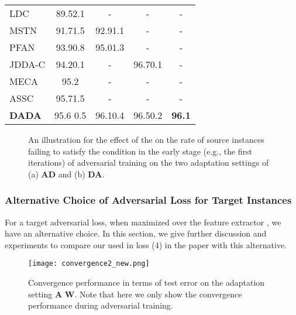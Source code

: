 \documentclass[letterpaper]{article} \usepackage{aaai20}  \usepackage{times}  \usepackage{helvet} \usepackage{courier}  \usepackage[hyphens]{url}  \usepackage{graphicx} \urlstyle{rm} \def\UrlFont{\rm}  \usepackage{graphicx}  \frenchspacing  \setlength{\pdfpagewidth}{8.5in}  \setlength{\pdfpageheight}{11in}
\begin{document}
\begin{table*}
\begin{center}
\begin{tabular}{lcccc}
			LDC \cite{layerWiseCorrection} & 89.52.1 & - & - & - \\ 

			MSTN \cite{mstn}        & 91.71.5 & 92.91.1 & - & - \\ 

			PFAN \cite{pfan}        & 93.90.8 & 95.01.3 & - & - \\ 

			JDDA-C \cite{jdda}      & 94.20.1 & - & 96.70.1 & - \\

			MECA \cite{meca}        & 95.2 & - & - & - \\
			
			ASSC \cite{associativeDA}        & 95.71.5 & - & - & - \\ 

			\hline
			\textbf{DADA}           & 95.6  0.5 & 96.10.4 & 96.50.2 & \textbf{96.1} \\
			\hline
		\end{tabular} 
	\end{center}
\end{table*} 


\begin{figure}[t]
	\begin{center} 


	\end{center}
	\caption{An illustration for the effect of the  on the rate of source instances failing to satisfy the condition in the early stage (e.g., the first  iterations) of adversarial training on the two adaptation settings of (a) \textbf{A}\textbf{D} and (b) \textbf{D}\textbf{A}.}
	\label{fig:verify_lambda}
\end{figure}

\subsubsection{Alternative Choice of Adversarial Loss for Target Instances}
\label{sec7}
For a target adversarial loss, when maximized over the feature extractor , we have an alternative choice. In this section, we give further discussion and experiments to compare our used  in loss (4) in the paper with this alternative. 

\begin{figure}[!ht]
	\begin{center} 
\texttt{[image: convergence2\_new.png]}
	\end{center}
	\caption{Convergence performance in terms of test error on the adaptation setting \textbf{A}  \textbf{W}. Note that here we only show the convergence performance during adversarial training.}
	\label{fig:convergence_fg_variants}
\end{figure}
\end{document}
